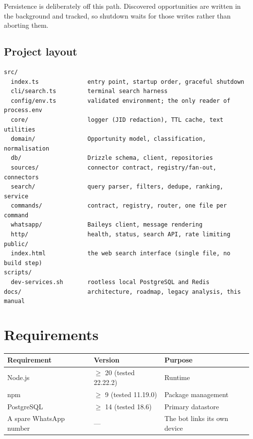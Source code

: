 \documentclass[11pt,a4paper]{report}
\newcommand{\dash}{---}
\begin{document}
Persistence is deliberately off this path. Discovered opportunities are written
in the background and tracked, so shutdown waits for those writes rather than
aborting them.

\section{Project layout}

\begin{lstlisting}
src/
  index.ts              entry point, startup order, graceful shutdown
  cli/search.ts         terminal search harness
  config/env.ts         validated environment; the only reader of process.env
  core/                 logger (JID redaction), TTL cache, text utilities
  domain/               Opportunity model, classification, normalisation
  db/                   Drizzle schema, client, repositories
  sources/              connector contract, registry/fan-out, connectors
  search/               query parser, filters, dedupe, ranking, service
  commands/             contract, registry, router, one file per command
  whatsapp/             Baileys client, message rendering
  http/                 health, status, search API, rate limiting
public/
  index.html            the web search interface (single file, no build step)
scripts/
  dev-services.sh       rootless local PostgreSQL and Redis
docs/                   architecture, roadmap, legacy analysis, this manual
\end{lstlisting}

\chapter{Requirements}

\begin{center}
\begin{tabularx}{\textwidth}{@{}llX@{}}
\toprule
\textbf{Requirement} & \textbf{Version} & \textbf{Purpose} \\
\midrule
Node.js & $\geq$ 20 (tested 22.22.2) & Runtime \\
npm & $\geq$ 9 (tested 11.19.0) & Package management \\
PostgreSQL & $\geq$ 14 (tested 18.6) & Primary datastore \\
A spare WhatsApp number & \dash{} & The bot links its own device \\
\bottomrule
\end{tabularx}
\end{center}
\end{document}
